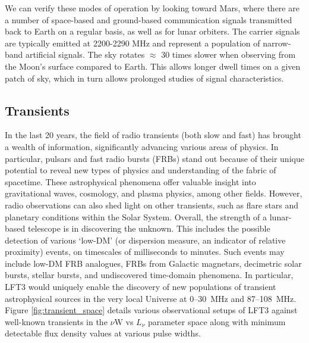 We can verify these modes of operation by looking toward Mars, where there are a number of space-based and ground-based communication signals transmitted back to Earth on a regular basis, as well as for lunar orbiters. The carrier signals are typically emitted at 2200-2290 MHz and represent a population of narrow-band artificial signals.
The sky rotates $\approx$ 30 times slower when observing from the Moon's surface compared to Earth. This allows longer dwell times on a given patch of sky, which in turn allows prolonged studies of signal characteristics. 

\subsection{Transients}
In the last 20 years, the field of radio transients (both slow and fast) has brought a wealth of information, significantly advancing various areas of physics. In particular, pulsars and fast radio bursts (FRBs) stand out because of their unique potential to reveal new types of physics \citep{beskin_radio_2015, ng_brief_2023} and understanding of the fabric of spacetime. These astrophysical phenomena offer valuable insight into gravitational waves, cosmology, and plasma physics, among other fields. However, radio observations can also shed light on other transients, such as flare stars and planetary conditions within the Solar System. Overall, the strength of a lunar-based telescope is in discovering the unknown. This includes the possible detection of various `low-DM' (or dispersion measure, an indicator of relative proximity) events, on timescales of milliseconds to minutes.  Such events may include low-DM FRB analogues, FRBs from Galactic magnetars, decimetric solar bursts, stellar bursts, and undiscovered time-domain phenomena. In particular, LFT3 would uniquely enable the discovery of new populations of transient astrophysical sources in the very local Universe at 0--30~MHz and 87--108~MHz. Figure \ref{fig:transient_space} details various observational setups of LFT3 against well-known transients in the $\nu \text{W}$ vs $L_\nu$ parameter space along with minimum detectable flux density values at various pulse widths.

